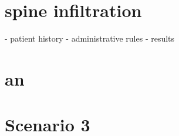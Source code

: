 


\section{spine infiltration}

- patient history
- administrative rules
- results

\section{an}



\section{Scenario 3}
